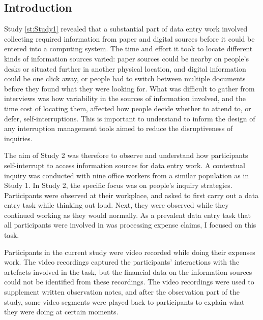\subsection{Introduction}
Study \ref{st:Study1} revealed that a substantial part of data entry work involved collecting required information from paper and digital sources before it could be entered into a computing system. The time and effort it took to locate different kinds of information sources varied: paper sources could be nearby on people's desks or situated further in another physical location, and digital information could be one click away, or people had to switch between multiple documents before they found what they were looking for. What was difficult to gather from interviews was how variability in the sources of information involved, and the time cost of locating them, affected how people decide whether to attend to, or defer, self-interruptions. This is important to understand to inform the design of any interruption management tools aimed to reduce the disruptiveness of inquiries.


The aim of Study 2 was therefore to observe and understand how participants self-interrupt to access information sources for data entry work. A contextual inquiry was conducted with nine office workers from a similar population as in Study 1. In Study 2, the specific focus was on people's inquiry strategies. Participants were observed at their workplace, and asked to first carry out a data entry task while thinking out loud. Next, they were observed while they continued working as they would normally. As a prevalent data entry task that all participants were involved in was processing expense claims, I focused on this task.

Participants in the current study were video recorded while doing their expenses work. The video recordings captured the participants' interactions with the artefacts involved in the task, but the financial data on the information sources could not be identified from these recordings. The video recordings were used to supplement written observation notes, and after the observation part of the study, some video segments were played back to participants to explain what they were doing at certain moments.

